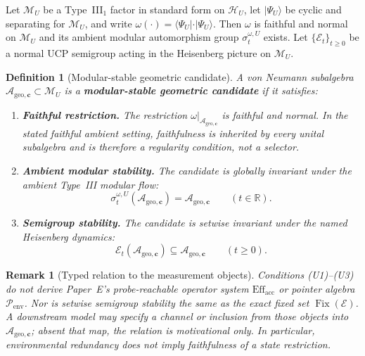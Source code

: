 \documentclass[12pt,a4paper,openany]{book}
\newtheorem{definition}[theorem]{Definition}
\newtheorem{remark}[theorem]{Remark}
\begin{document}
Let $\mathcal M_U$ be a Type~III$_1$ factor in standard form on $\mathcal H_U$, let $|\Psi_U\rangle$ be cyclic and separating for $\mathcal M_U$, and write $\omega(\cdot)=\langle\Psi_U|\cdot|\Psi_U\rangle$.  Then $\omega$ is faithful and normal on $\mathcal M_U$ and its ambient modular automorphism group $\sigma_t^{\omega,U}$ exists.  Let $\{\mathcal E_t\}_{t\ge0}$ be a normal UCP semigroup acting in the Heisenberg picture on $\mathcal M_U$.

\begin{definition}[Modular-stable geometric candidate]
\label{H-D-def:modular-accessible}
A von Neumann subalgebra $\mathcal{A}_{\mathrm{geo},\mathbf{c}}\subset\mathcal M_U$ is a \textbf{modular-stable geometric candidate} if it satisfies:

\begin{enumerate}
\item[\textup{(U1)}] \textbf{Faithful restriction.} The restriction $\omega|_{\mathcal{A}_{\mathrm{geo},\mathbf{c}}}$ is faithful and normal.  In the stated faithful ambient setting, faithfulness is inherited by every unital subalgebra and is therefore a regularity condition, not a selector.

\item[\textup{(U2)}] \textbf{Ambient modular stability.} The candidate is globally invariant under the ambient Type~III modular flow:
\begin{equation}
\sigma_t^{\omega,U}(\mathcal{A}_{\mathrm{geo},\mathbf{c}})
=\mathcal{A}_{\mathrm{geo},\mathbf{c}}
\qquad(t\in\mathbb R).
\end{equation}

\item[\textup{(U3)}] \textbf{Semigroup stability.} The candidate is setwise invariant under the named Heisenberg dynamics:
\begin{equation}
\mathcal E_t(\mathcal{A}_{\mathrm{geo},\mathbf{c}})
\subseteq\mathcal{A}_{\mathrm{geo},\mathbf{c}}
\qquad(t\ge0).
\end{equation}
\end{enumerate}
\end{definition}

\begin{remark}[Typed relation to the measurement objects]
\label{H-D-rem:translation}
Conditions (U1)--(U3) do not derive Paper~E's probe-reachable operator system $\mathrm{Eff}_{\mathrm{acc}}$ or pointer algebra $\mathcal P_{\mathrm{env}}$.  Nor is setwise semigroup stability the same as the exact fixed set $\operatorname{Fix}(\mathcal E)$.  A downstream model may specify a channel or inclusion from those objects into $\mathcal{A}_{\mathrm{geo},\mathbf{c}}$; absent that map, the relation is motivational only.  In particular, environmental redundancy does not imply faithfulness of a state restriction.
\end{remark}
\end{document}
